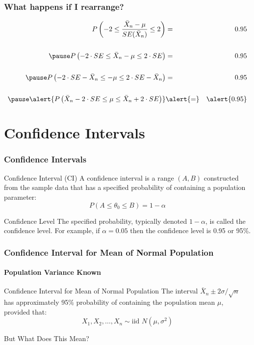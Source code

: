 \documentclass{beamer}
\begin{document}
\begin{frame}
\frametitle{What happens if I rearrange?}
	\begin{eqnarray*}
		P\left(-2 \leq \frac{\bar{X}_n - \mu}{SE(\bar{X}_n)} \leq 2 \right) &=& 0.95\\ \\ \pause
			P\left(-2\cdot SE\leq \bar{X}_n - \mu \leq 2 \cdot SE\right) &=& 0.95\\ \\ \pause
			P\left(-2\cdot SE - \bar{X}_n \leq - \mu \leq 2 \cdot SE - \bar{X}_n \right) &=& 0.95\\ \\ \pause
			\alert{P\left( \bar{X}_n - 2\cdot SE \leq \mu \leq \bar{X}_n + 2\cdot SE \right)}&\alert{=}& \alert{0.95}
	\end{eqnarray*}

\end{frame}

\section{Confidence Intervals}
\begin{frame}
\frametitle{Confidence Intervals}

\begin{block}{Confidence Interval (CI)}
A confidence interval is a range $(A,B)$ constructed from the \alert{sample data} that has a specified probability of containing a \alert{population parameter}:
	$$P(A \leq \theta_0 \leq B) = 1-\alpha$$
\end{block} 

\pause

\begin{block}{Confidence Level}
The \alert{specified probability}, typically denoted $1-\alpha$, is called the confidence level. For example, if $\alpha = 0.05$ then the confidence level is 0.95 or 95\%.
\end{block}
\end{frame}

\begin{frame}
\frametitle{Confidence Interval for Mean of Normal Population}
\framesubtitle{Population Variance Known}


\begin{block}{Confidence Interval for Mean of Normal Population}
	The interval \alert{$\boxed{\bar{X}_n \pm 2 \sigma/\sqrt{n}}$} has approximately 95\% probability of containing the population mean $\mu$, provided that:
		$$\boxed{X_1, X_2, \hdots, X_n\sim \mbox{iid } N(\mu,\sigma^2)}$$
\end{block}

\pause

\begin{alertblock}{But What Does This Mean?}
\end{alertblock}

\end{frame}
\end{document}
